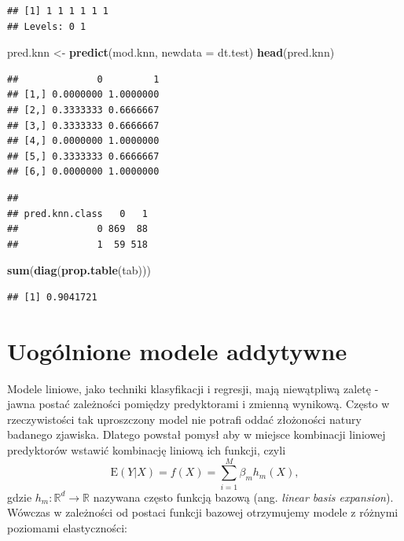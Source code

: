 \documentclass[
]{book}
\newenvironment{Shaded}{\begin{snugshade}}{\end{snugshade}}
\newcommand{\AttributeTok}[1]{\textcolor[rgb]{0.13,0.29,0.53}{#1}}
\newcommand{\FunctionTok}[1]{\textcolor[rgb]{0.13,0.29,0.53}{\textbf{#1}}}
\newcommand{\NormalTok}[1]{#1}
\newcommand{\OtherTok}[1]{\textcolor[rgb]{0.56,0.35,0.01}{#1}}
\newcommand{\SpecialCharTok}[1]{\textcolor[rgb]{0.81,0.36,0.00}{\textbf{#1}}}
\newcommand{\E}{\mathrm{E}}
\theoremstyle{plain}
\theoremstyle{definition}
\theoremstyle{definition}
\theoremstyle{definition}
\theoremstyle{definition}
\theoremstyle{definition}
\theoremstyle{remark}
\begin{document}
\begin{verbatim}
## [1] 1 1 1 1 1 1
## Levels: 0 1
\end{verbatim}

\begin{Shaded}
\begin{Highlighting}[]
\NormalTok{pred.knn }\OtherTok{\textless{}{-}} \FunctionTok{predict}\NormalTok{(mod.knn, }\AttributeTok{newdata =}\NormalTok{ dt.test)}
\FunctionTok{head}\NormalTok{(pred.knn)}
\end{Highlighting}
\end{Shaded}

\begin{verbatim}
##              0         1
## [1,] 0.0000000 1.0000000
## [2,] 0.3333333 0.6666667
## [3,] 0.3333333 0.6666667
## [4,] 0.0000000 1.0000000
## [5,] 0.3333333 0.6666667
## [6,] 0.0000000 1.0000000
\end{verbatim}

\begin{Shaded}
\end{Shaded}

\begin{verbatim}
##               
## pred.knn.class   0   1
##              0 869  88
##              1  59 518
\end{verbatim}

\begin{Shaded}
\begin{Highlighting}[]
\FunctionTok{sum}\NormalTok{(}\FunctionTok{diag}\NormalTok{(}\FunctionTok{prop.table}\NormalTok{(tab)))}
\end{Highlighting}
\end{Shaded}

\begin{verbatim}
## [1] 0.9041721
\end{verbatim}

\chapter{Uogólnione modele addytywne}\label{uoguxf3lnione-modele-addytywne}

Modele liniowe, jako techniki klasyfikacji i regresji, mają niewątpliwą zaletę - jawna postać zależności pomiędzy predyktorami i zmienną wynikową. Często w rzeczywistości tak uproszczony model nie potrafi oddać złożoności natury badanego zjawiska. Dlatego powstał pomysł aby w miejsce kombinacji liniowej predyktorów wstawić kombinację liniową ich funkcji, czyli
\begin{equation}
    \E(Y|X)=f(X) = \sum_{i=1}^M\beta_mh_m(X),
    \label{eq:row111}
\end{equation}
gdzie \(h_m:\mathbb{R}^d\to\mathbb{R}\) nazywana często funkcją bazową (ang. \emph{linear basis expansion}). Wówczas w zależności od postaci funkcji bazowej otrzymujemy modele z różnymi poziomami elastyczności:
\end{document}
